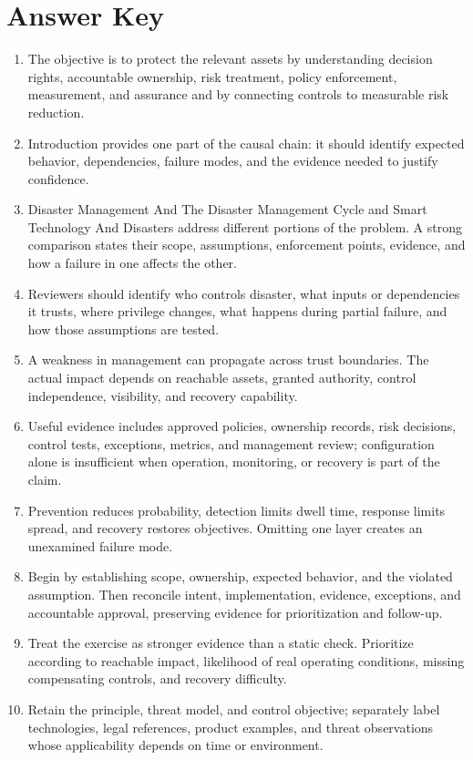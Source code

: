 \documentclass[11pt,letterpaper]{article}
\begin{document}
\section*{Answer Key}
\begin{enumerate}
\item The objective is to protect the relevant assets by understanding decision rights, accountable ownership, risk treatment, policy enforcement, measurement, and assurance and by connecting controls to measurable risk reduction.
\item Introduction provides one part of the causal chain: it should identify expected behavior, dependencies, failure modes, and the evidence needed to justify confidence.
\item Disaster Management And The Disaster Management Cycle and Smart Technology And Disasters address different portions of the problem. A strong comparison states their scope, assumptions, enforcement points, evidence, and how a failure in one affects the other.
\item Reviewers should identify who controls disaster, what inputs or dependencies it trusts, where privilege changes, what happens during partial failure, and how those assumptions are tested.
\item A weakness in management can propagate across trust boundaries. The actual impact depends on reachable assets, granted authority, control independence, visibility, and recovery capability.
\item Useful evidence includes approved policies, ownership records, risk decisions, control tests, exceptions, metrics, and management review; configuration alone is insufficient when operation, monitoring, or recovery is part of the claim.
\item Prevention reduces probability, detection limits dwell time, response limits spread, and recovery restores objectives. Omitting one layer creates an unexamined failure mode.
\item Begin by establishing scope, ownership, expected behavior, and the violated assumption. Then reconcile intent, implementation, evidence, exceptions, and accountable approval, preserving evidence for prioritization and follow-up.
\item Treat the exercise as stronger evidence than a static check. Prioritize according to reachable impact, likelihood of real operating conditions, missing compensating controls, and recovery difficulty.
\item Retain the principle, threat model, and control objective; separately label technologies, legal references, product examples, and threat observations whose applicability depends on time or environment.
\end{enumerate}
\end{document}
